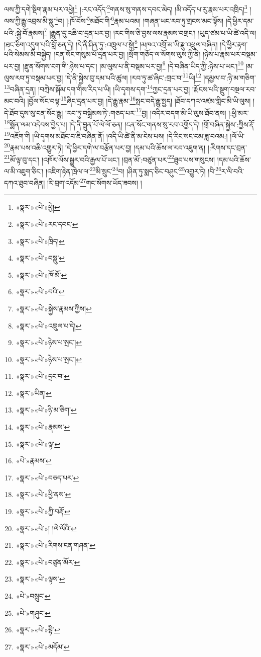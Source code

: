 ལས་ཀྱི་དགེ་སྡིག་རྣམ་པར་འཕྱེ།\footnote{«སྣར་»«པེ་»ཕྱེ།} །:རང་འདོད་\footnote{«སྣར་»«པེ་»རང་དབང་}གནས་སུ་གནས་དབང་མེད། །མི་འདོད་པ་རུ་རྣམ་པར་འཁྲིད།\footnote{«སྣར་»«པེ་»ཁྲིད།} །ལས་ཀྱི་རྒྱུ་འབྲས་མི་སླུ་\footnote{«སྣར་»«པེ་»བསླུ་}བ། །:ཁོ་བོས་\footnote{«སྣར་»«པེ་»ཁོ་མོ་}མཐོང་གི་\footnote{«སྣར་»«པེ་»བའི་}རྣམ་པའམ། །གཞན་ཡང་རབ་ཏུ་གྲངས་མང་ལྟོས། །དེ་ཕྱིར་དམ་པའི་:སྐྱེ་བོ་རྣམས།\footnote{«སྣར་»«པེ་»སྐྱེས་རྣམས་ཀྱིས།} །རྒྱུན་དུ་འཆི་བ་དྲན་པར་བྱ། །རང་གིས་ཅི་བྱས་ལས་རྣམས་བགྲང་། །ཡུད་ཙམ་པ་ཡི་ཚེ་འདི་ལ། །ཐང་ཅིག་འདུག་པའི་བློ་ཅན་དེ། །དེ་ནི་ཤིན་ཏུ་:འཁྲུལ་པ་སྟེ།\footnote{«སྣར་»«པེ་»འཁྲུལ་པ་དེ།} །མཁའ་འགྲོ་མ་ཡི་རྫུ་འཕྲུལ་བཞིན། །དེ་ཕྱིར་རྟག་པའི་སེམས་མི་བསྐྱེད། །ངན་སོང་གསུམ་པོ་དྲན་པར་བྱ། །སྲོག་གཅོད་ལ་སོགས་ལུས་ཀྱི་ནི། །ཉེས་པ་རྣམ་པར་བསྡམ་པར་བྱ། །རྫུན་སོགས་ངག་གི་:ཉེས་པ་དང་། །མ་ལུས་པ་ནི་བསྡམ་པར་བྱ།\footnote{«སྣར་»«པེ་»ཉེས་པ་སྤང་།} །དེ་བཞིན་ཡིད་ཀྱི་:ཉེས་པ་ཡང་།\footnote{«སྣར་»«པེ་»ཉེས་པ་སྤང་།} །མ་ལུས་རབ་ཏུ་བསྡམ་པར་བྱ། །དེ་ནི་སྐྱེས་བུ་དམ་པའི་ཚུལ། །རབ་ཏུ་ཚ་ཞིང་:གྲང་བ་\footnote{«སྣར་»«པེ་»དྲང་བ་}ཡི།\footnote{«སྣར་»ཡིན།} །དམྱལ་བ་:ཉི་མ་གཅིག་\footnote{«སྣར་»«པེ་»ཉི་མ་ཅིག་}བཞིན་དྲན། །བཀྲེས་སྐོམ་དག་གིས་རིད་པ་ཡི། །ཡི་དྭགས་དག་\footnote{«སྣར་»«པེ་»རྣམས་}ཀྱང་དྲན་པར་བྱ། །རྨོངས་པའི་སྡུག་བསྔལ་རབ་མང་བའི། །བྱོལ་སོང་བལྟ་\footnote{«སྣར་»«པེ་»ལྟ་}ཞིང་དྲན་པར་བྱ། །དེ་རྒྱུ་རྣམ་\footnote{«པེ་»རྣམས་}སྤང་བདེ་རྒྱུ་སྤྱད། །ཐོབ་དཀའ་འཛམ་གླིང་མི་ཡི་ལུས། །དེ་ཐོབ་དུས་སུ་ངན་སོང་རྒྱུ། །རབ་ཏུ་བསྒྲིམས་ཏེ་:གཅད་པར་\footnote{«སྣར་»«པེ་»བཅད་པར་}བྱ། །འདིར་བདག་མི་ཡི་ལུས་ཐོབ་ནས། །:ཕྱི་མར་\footnote{«སྣར་»«པེ་»ཕྱི་ནས་}སྨོན་ལམ་འདེབས་བྱེད་པ། །དེ་ནི་བླུན་པོ་ལེ་ལོ་ཅན། །ངན་སོང་གནས་སུ་རབ་འགྱོད་དེ། །གྲོ་བཞིན་སྐྱེས་:ཀྱིས་རྡོ་\footnote{«སྣར་»«པེ་»ཀྱི་བརྡོ་}འཇོག་གི །ཡི་དྭགས་མཐོང་བ་ཇི་བཞིན་ནོ། །འདི་ཡི་ཚེ་ནི་མ་ངེས་པས། །དེ་རིང་སང་ངམ་ཟླ་བའམ:། །ལོ་ཡི་\footnote{«སྣར་»«པེ་»། །ལེ་ལོའི་}རྣམ་པས་འཆི་འགྱུར་ཏེ། །དེ་ཕྱིར་དགེ་ལ་བརྩོན་པར་བྱ། །དམ་པའི་ཆོས་ལ་རབ་འཇུག་ན། །:རིགས་དང་བྲན་\footnote{«སྣར་»«པེ་»རིགས་ངན་གཤན་}མོ་ལྟ་བུ་དང་། །འཁོར་ལོས་སྒྱུར་བའི་རྒྱལ་པོ་ཡང་། །བྲན་མོ་:བཙུན་པར་\footnote{«སྣར་»«པེ་»བཙུན་མོར་}ཐུབ་པས་གསུངས། །དམ་པའི་ཆོས་ལ་མི་འཇུག་ཅིང་། །འཇིག་རྟེན་ཁྲེལ་ལ་\footnote{«སྣར་»«པེ་»ལྟས་}མི་སྲུང་\footnote{«པེ་»བསྲུང་}བ། །ཤིན་ཏུ་སྨད་ཅིང་བཤུང་\footnote{«པེ་»གཤུང་}འགྱུར་ཏེ། །བི་\footnote{«སྣར་»«པེ་»བྷི་}ར་ལི་བའི་དཀའ་ཐུབ་བཞིན། །རི་བྲག་འདོམ་\footnote{«སྣར་»«པེ་»མདོམ་}གང་སོགས་ཡོད་ཟབས། །
